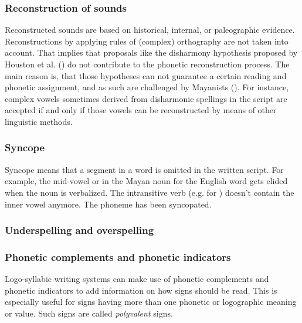 \documentclass[../main.tex]{subfiles}
\begin{document}
\subsubsection{Reconstruction of sounds}
Reconstructed sounds are based on historical, internal, or paleographic evidence.
Reconstructions by applying rules of (complex) orthography are not taken into account.
That implies that proposals like the disharmony hypothesis proposed by 
Houston et al. (\cites{lacadena2004}{houstonstuartrobertson1998}) do not contribute to the
phonetic reconstruction process.
The main reason is, that those hypotheses can not guarantee a certain reading and phonetic
assignment, and as such are challenged by Mayanists (\cite[7]{boot2009}).
For instance, complex vowels sometimes derived from disharmonic spellings in the script are
accepted if and only if those vowels can be reconstructed by means of other linguistic methods.

\subsubsection{Syncope}
Syncope means that a segment in a word is omitted in the written script.
For example, the mid-vowel  or  in the Mayan noun  
for the English word  gets elided when the noun is verbalized.
The intransitive verb  (e.g.  for )
doesn't contain the inner vowel anymore.
The phoneme has been syncopated.

\subsubsection{Underspelling and overspelling}

\subsubsection{Phonetic complements and phonetic indicators}
\newcommand{\texticon}[1]{\texttt{[image: \#1]}}
Logo-syllabic writing systems can make use of phonetic complements and phonetic indicators to
add information on how signs should be read.
This is especially useful for signs having more than one phonetic or logographic meaning or value.
Such signs are called \emph{polyvalent} signs.
\end{document}
